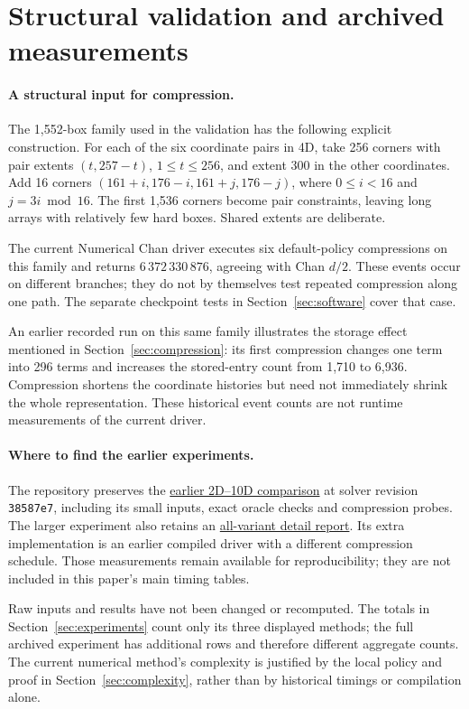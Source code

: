 \section{Structural validation and archived measurements}
\label{sec:archived}

\paragraph{A structural input for compression.}
The 1,552-box family used in the validation has the following explicit
construction. For each of the six coordinate pairs in 4D, take 256
corners with pair extents $(t,257-t)$, $1\le t\le256$, and extent 300
in the other coordinates. Add 16 corners
$(161+i,176-i,161+j,176-j)$, where $0\le i<16$ and $j=3i\bmod16$.
The first 1,536 corners become pair constraints, leaving long arrays
with relatively few hard boxes. Shared extents are deliberate.

The current Numerical Chan driver executes six default-policy compressions
on this family and returns $6\,372\,330\,876$, agreeing with Chan $d/2$.
These events occur on different branches; they do not by themselves
test repeated compression along one path. The separate checkpoint
tests in Section~\ref{sec:software} cover that case.

An earlier recorded run on this same family illustrates the storage
effect mentioned in Section~\ref{sec:compression}: its first compression
changes one term into 296 terms and increases the stored-entry count
from 1,710 to 6,936. Compression shortens the coordinate histories but
need not immediately shrink the whole representation. These historical
event counts are not runtime measurements of the current driver.

\paragraph{Where to find the earlier experiments.}
The repository preserves the
\href{https://github.com/emmerichmtm/FastHVChan/blob/main/NumericalChanHVND/benchmarks/compiled_2d_10d/RESULTS.md}{earlier 2D--10D comparison}
at solver revision \texttt{38587e7}, including its small inputs, exact
oracle checks and compression probes. The larger experiment also retains
an \href{https://github.com/emmerichmtm/FastHVChan/blob/main/NumericalChanHVND/benchmarks/larger_4d_6d/RESULTS_ALL_VARIANTS.md}{all-variant detail report}.
Its extra implementation is an earlier compiled driver with a different
compression schedule. Those measurements remain available for
reproducibility; they are not included in this paper's main timing tables.

Raw inputs and results have not been changed or recomputed. The totals
in Section~\ref{sec:experiments} count only its three displayed methods;
the full archived experiment has additional rows and therefore different
aggregate counts. The current numerical method's complexity is justified
by the local policy and proof in Section~\ref{sec:complexity}, rather
than by historical timings or compilation alone.
